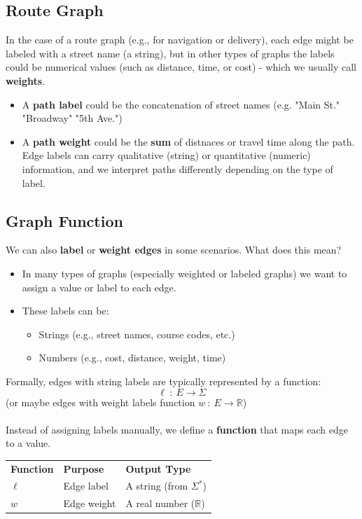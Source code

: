 \documentclass[10pt]{article}
\begin{document}
\subsection*{Route Graph}
In the case of a route graph (e.g., for navigation or delivery), each edge might be labeled with a street name (a string), but in other types of graphs the labels could be numerical values (such as distance, time, or cost) - which we usually call \textbf{weights}.\\
\begin{itemize}
	\item A \textbf{path label} could be the concatenation of street names (e.g. "Main St." \textrightarrow "Broadway" \textrightarrow "5th Ave.")
	\item A \textbf{path weight} could be the \textbf{sum} of distnaces or travel time along the path.  Edge labels can carry qualitative (string) or quantitative (numeric) information, and we interpret paths differently depending on the type of label.
\end{itemize}

\subsection*{Graph Function}
We can also \textbf{label} or \textbf{weight edges} in some scenarios.  What does this mean?
\begin{itemize}
	\item In many types of graphs (especially weighted or labeled graphs) we want to assign a value or label to each edge.
	\item These labels can be:
	\begin{itemize}
	    \item Strings (e.g., street names, course codes, etc.)
	    \item Numbers (e.g., cost, distance, weight, time)
    \end{itemize}
\end{itemize}
Formally, edges with string labels are typically represented by a function:
\[\ell \::\: E \rightarrow \Sigma\]
(or maybe edges with weight labels function $w \::\: E \rightarrow \mathbb{R}$)\\\\
Instead of assigning labels manually, we define a \textbf{function} that maps each edge to a value.
\begin{center}
    \begin{tabularx}{\textwidth}{XXX}
    \textbf{Function} & \textbf{Purpose} & \textbf{Output Type} \\
    $\ell$ & Edge label & A string (from $\Sigma^*$) \\
    $w$ & Edge weight & A real number ($\mathbb{R}$)
    \end{tabularx}
\end{center}
\end{document}
